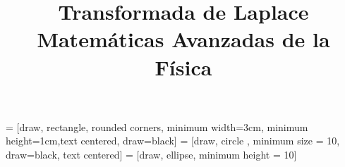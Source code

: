 
\usepackage{standalone}
\usepackage{mathrsfs}
\usepackage{bigints}
\usepackage{tikz}
\usetikzlibrary{decorations.pathmorphing,patterns}
\usetikzlibrary{shapes.geometric, arrows}
 = [draw, rectangle, rounded corners, minimum width=3cm, minimum height=1cm,text centered, draw=black]
 = [draw, circle , minimum size = 10, draw=black, text centered]
 = [draw, ellipse, minimum height = 10]
\usepackage{pgfplots}
\usepackage{float}
\newtheorem{defi}{{\textit{Definición}}}[section]
\newtheorem{teo}{{\textit{Teorema}}}[section]
\newtheorem{cor}{Corolario}
\newcommand{\saltosin}{\nonumber \\}
\title{Transformada de Laplace \\ {\large Matemáticas Avanzadas de la Física}}
\date{ }

\renewcommand\labelenumii{\theenumi.{\arabic{enumii}}}
\maketitle
\fontsize{14}{14}\selectfont
